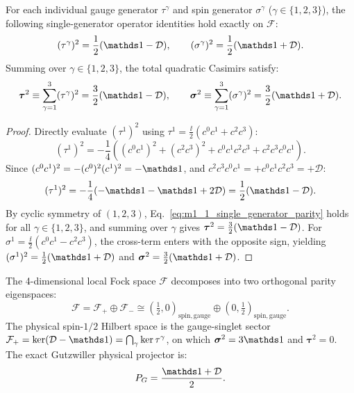\begin{theorem}
\label{thm:m1_1_casimir_identities}
For each individual gauge generator $\tau^\gamma$ and spin generator $\sigma^\gamma$ ($\gamma \in \{1, 2, 3\}$), the following single-generator operator identities hold exactly on $\mathcal{F}$:
\begin{equation}
\label{eq:m1_1_single_generator_parity}
(\tau^\gamma)^2 = \frac{1}{2}(\Id - \mathcal{D}), \qquad (\sigma^\gamma)^2 = \frac{1}{2}(\Id + \mathcal{D}).
\end{equation}
Summing over $\gamma \in \{1, 2, 3\}$, the total quadratic Casimirs satisfy:
\begin{equation}
\label{eq:m1_1_casimir_sums}
\bm{\tau}^2 \equiv \sum_{\gamma=1}^3 (\tau^\gamma)^2 = \frac{3}{2}(\Id - \mathcal{D}), \qquad \bm{\sigma}^2 \equiv \sum_{\gamma=1}^3 (\sigma^\gamma)^2 = \frac{3}{2}(\Id + \mathcal{D}).
\end{equation}
\end{theorem}
\begin{proof}
Directly evaluate $(\tau^1)^2$ using $\tau^1 = \frac{\ii}{2}(c^0 c^1 + c^2 c^3)$:
\begin{equation}
(\tau^1)^2 = -\frac{1}{4}\left( (c^0 c^1)^2 + (c^2 c^3)^2 + c^0 c^1 c^2 c^3 + c^2 c^3 c^0 c^1 \right).
\end{equation}
Since $(c^0 c^1)^2 = -(c^0)^2 (c^1)^2 = -\Id$, and $c^2 c^3 c^0 c^1 = +c^0 c^1 c^2 c^3 = +\mathcal{D}$:
\begin{equation}
(\tau^1)^2 = -\frac{1}{4}(-\Id - \Id + 2\mathcal{D}) = \frac{1}{2}(\Id - \mathcal{D}).
\end{equation}
By cyclic symmetry of $(1, 2, 3)$, Eq.~\eqref{eq:m1_1_single_generator_parity} holds for all $\gamma \in \{1, 2, 3\}$, and summing over $\gamma$ gives $\bm{\tau}^2 = \frac{3}{2}(\Id - \mathcal{D})$. For $\sigma^1 = \frac{\ii}{2}(c^0 c^1 - c^2 c^3)$, the cross-term enters with the opposite sign, yielding $(\sigma^1)^2 = \frac{1}{2}(\Id + \mathcal{D})$ and $\bm{\sigma}^2 = \frac{3}{2}(\Id + \mathcal{D})$.
\end{proof}

The 4-dimensional local Fock space $\mathcal{F}$ decomposes into two orthogonal parity eigenspaces:
\begin{equation}
\label{eq:m1_1_fock_decomposition}
\mathcal{F} = \mathcal{F}_+ \oplus \mathcal{F}_- \cong \left(\tfrac{1}{2}, 0\right)_{\mathrm{spin,gauge}} \oplus \left(0, \tfrac{1}{2}\right)_{\mathrm{spin,gauge}}.
\end{equation}
The physical spin-$1/2$ Hilbert space is the gauge-singlet sector $\mathcal{F}_+ = \ker(\mathcal{D} - \Id) = \bigcap_\gamma \ker \tau^\gamma$, on which $\bm{\sigma}^2 = 3\Id$ and $\bm{\tau}^2 = 0$. The exact Gutzwiller physical projector is:
\begin{equation}
\label{eq:m1_1_gutzwiller_projector}
P_G = \frac{\Id + \mathcal{D}}{2}.
\end{equation}

